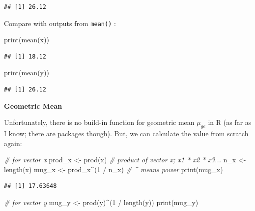 \documentclass[
]{book}
\newenvironment{Shaded}{\begin{snugshade}}{\end{snugshade}}
\newcommand{\CommentTok}[1]{\textcolor[rgb]{0.56,0.35,0.01}{\textit{#1}}}
\newcommand{\DecValTok}[1]{\textcolor[rgb]{0.00,0.00,0.81}{#1}}
\newcommand{\FunctionTok}[1]{\textcolor[rgb]{0.00,0.00,0.00}{#1}}
\newcommand{\NormalTok}[1]{#1}
\newcommand{\OtherTok}[1]{\textcolor[rgb]{0.56,0.35,0.01}{#1}}
\newcommand{\SpecialCharTok}[1]{\textcolor[rgb]{0.00,0.00,0.00}{#1}}
\begin{document}
\begin{verbatim}
## [1] 26.12
\end{verbatim}

Compare with outputs from \texttt{mean()} :

\begin{Shaded}
\begin{Highlighting}[]
\FunctionTok{print}\NormalTok{(}\FunctionTok{mean}\NormalTok{(x))}
\end{Highlighting}
\end{Shaded}

\begin{verbatim}
## [1] 18.12
\end{verbatim}

\begin{Shaded}
\begin{Highlighting}[]
\FunctionTok{print}\NormalTok{(}\FunctionTok{mean}\NormalTok{(y))}
\end{Highlighting}
\end{Shaded}

\begin{verbatim}
## [1] 26.12
\end{verbatim}

\textbf{Geometric Mean}

Unfortunately, there is no build-in function for geometric mean \(\mu_{ge}\) in R (as far as I know; there are packages though). But, we can calculate the value from scratch again:

\begin{Shaded}
\begin{Highlighting}[]
\CommentTok{\# for vector x}
\NormalTok{prod\_x }\OtherTok{\textless{}{-}} \FunctionTok{prod}\NormalTok{(x) }\CommentTok{\# product of vector x; x1 * x2 * x3...}
\NormalTok{n\_x }\OtherTok{\textless{}{-}} \FunctionTok{length}\NormalTok{(x)}
\NormalTok{mug\_x }\OtherTok{\textless{}{-}}\NormalTok{ prod\_x}\SpecialCharTok{\^{}}\NormalTok{(}\DecValTok{1} \SpecialCharTok{/}\NormalTok{ n\_x) }\CommentTok{\# \^{} means power}
\FunctionTok{print}\NormalTok{(mug\_x)}
\end{Highlighting}
\end{Shaded}

\begin{verbatim}
## [1] 17.63648
\end{verbatim}

\begin{Shaded}
\begin{Highlighting}[]
\CommentTok{\# for vector y}
\NormalTok{mug\_y }\OtherTok{\textless{}{-}} \FunctionTok{prod}\NormalTok{(y)}\SpecialCharTok{\^{}}\NormalTok{(}\DecValTok{1} \SpecialCharTok{/} \FunctionTok{length}\NormalTok{(y))}
\FunctionTok{print}\NormalTok{(mug\_y)}
\end{Highlighting}
\end{Shaded}
\end{document}

